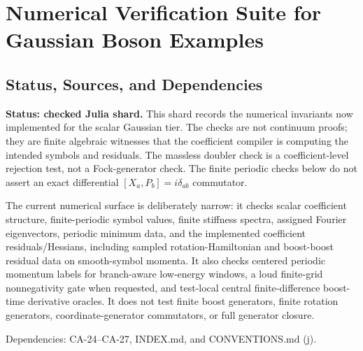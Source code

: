 
\section{Numerical Verification Suite for Gaussian Boson Examples}
\label{sec:gaussian-boson-numerical-suite}

\subsection{Status, Sources, and Dependencies}

\textbf{Status: checked Julia shard.}  This shard records the numerical
invariants now implemented for the scalar Gaussian tier.  The checks are not
continuum proofs; they are finite algebraic witnesses that the coefficient
compiler is computing the intended symbols and residuals.  The massless doubler
check is a coefficient-level rejection test, not a Fock-generator check.  The
finite periodic checks below do not assert an exact differential
\([X_a,P_b]=i\delta_{ab}\) commutator.

The current numerical surface is deliberately narrow: it checks scalar
coefficient structure, finite-periodic symbol values, finite stiffness spectra,
assigned Fourier eigenvectors, periodic minimum data, and the implemented
coefficient residuals/Hessians, including sampled rotation-Hamiltonian and
boost-boost residual data on smooth-symbol momenta.  It also checks centered
periodic momentum labels for branch-aware low-energy windows, a loud finite-grid
nonnegativity gate when requested, and test-local central
finite-difference boost-time derivative oracles.  It does not test finite boost
generators, finite rotation generators, coordinate-generator commutators, or
full generator closure.

Dependencies: CA-24--CA-27, INDEX.md, and CONVENTIONS.md (j).



